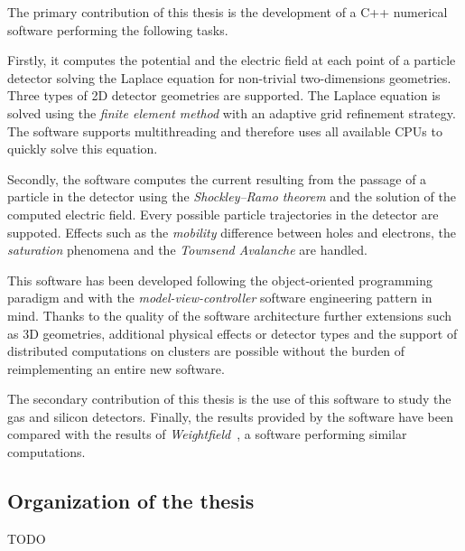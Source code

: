 \documentclass[11pt]{article}
\begin{document}
		The primary contribution of this thesis is the development of a C++ numerical software performing the
		following tasks.

		Firstly, it computes the potential and the electric field
		at each point of a particle detector solving the Laplace equation for non-trivial
		two-dimensions geometries. Three types of 2D detector geometries are supported.
		The Laplace equation is solved using the \textit{finite element method} with an adaptive
		grid refinement strategy. The software supports multithreading and therefore
		uses all available CPUs to quickly solve this equation.

		Secondly, the software computes the current resulting from the passage of a particle
		in the detector using the \textit{Shockley–Ramo theorem} and the solution of the
		computed electric field. Every possible particle trajectories in the detector
		are suppoted. Effects such as the \textit{mobility} difference between holes and
		electrons, the \textit{saturation} phenomena and the \textit{Townsend Avalanche}
		are handled.

		This software has been developed following the object-oriented
		programming paradigm and with the \textit{model-view-controller}
		software engineering pattern in mind. Thanks to the quality of the software
		architecture further extensions such as 3D geometries, additional physical effects or
		detector types and the support of distributed computations on clusters are possible
		without the burden of reimplementing an entire new software.

		The secondary contribution of this thesis is the use of this software to study
		the gas and silicon detectors. Finally, the results provided by the
		software have been compared with the results of \textit{Weightfield}~\cite{Cenna2015}, a
		software performing similar computations.


	\subsection*{Organization of the thesis}

		TODO

\end{document}
